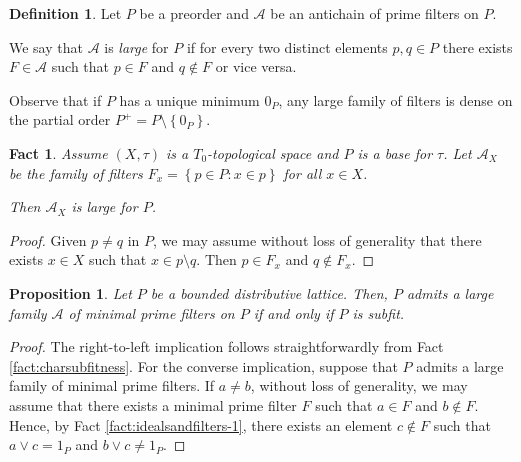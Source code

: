 \documentclass{article}
\newcommand{\aaa}{\mathcal{A} }
\theoremstyle{plain}
\newtheorem{proposition}[theorem]{Proposition}
\newtheorem{fact}[theorem]{Fact}
\theoremstyle{definition}
\newtheorem{definition}[theorem]{Definition}
\theoremstyle{remark}
\newcommand{\bp}[1]{\left\lbrace #1 \right\rbrace}
\newcommand{\0}{\mathbbm 0}
\newcommand{\1}{\mathbbm 1}
\newcommand{\2}{\mathbbm 2}
\begin{document}
\begin{definition}
\label{def:largefamily}
Let $P$ be a preorder and $\aaa$ be an antichain of prime filters on $P$. 

We say that $\aaa$ is \emph{large} for $P$ if for every two distinct elements $p,q \in P$ there exists $F \in \aaa$ such that $p \in F$ and $q \notin F$ or vice versa. 
\end{definition}

Observe that if \(P\) has a unique minimum $0_P$, any large family of filters is dense on the partial order $P^+=P\setminus\bp{0_P}$.

\begin{fact}
\label{fact:neighborhoodfiltersarelarge}
Assume $(X,\tau)$ is a $T_0$-topological space and $P$ is a base for $\tau$.
Let $\aaa_X$ be the family of filters $F_x=\bp{p\in P:x\in p}$ for all $x \in X$.

Then $\aaa_X$ is large for $P$.
\end{fact}

\begin{proof}
Given $p\neq q$ in $P$, we may assume without loss of generality that there exists $x \in X$ such that $x \in p\setminus q$.
Then $p\in F_x$ and $q\not\in F_x$.
\end{proof}




\begin{proposition}
\label{prop:charsubfit}
Let $P$ be a bounded distributive lattice.
Then, $P$ admits a large  family $\mathcal{A}$ of minimal prime filters on $P$  if and only if $P$ is subfit.
\end{proposition}
\begin{proof}
The right-to-left implication follows straightforwardly from Fact \ref{fact:charsubfitness}.
For the converse implication, suppose that \( P \) admits a large family of minimal prime filters. If \( a \neq b \), without loss of generality, we may assume that there exists a minimal prime filter \( F \) such that \( a \in F \) and \( b \notin F \). Hence, by Fact \ref{fact:idealsandfilters-1}, there exists an element \( c \notin F \) such that \(a \vee c = 1_P \) and \( b \vee c \neq 1_P\).
\end{proof}
\end{document}
